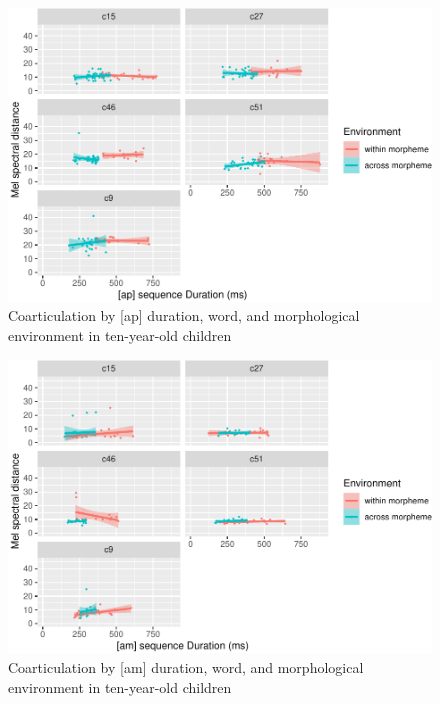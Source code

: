 \documentclass[a4paper,man,floatsintext,natbib,donotrepeattitle, apacite]{apa6}
\begin{document}
\begin{figure}
\centering
\includegraphics{3_ch3_results_files/figure-latex/ten-facet-ap-1.pdf}
\caption{\label{fig:ten-facet-ap}Coarticulation by {[}ap{]} duration, word, and morphological environment in ten-year-old children}
\end{figure}

\begin{figure}
\centering
\includegraphics{3_ch3_results_files/figure-latex/ten-facet-am-1.pdf}
\caption{\label{fig:ten-facet-am}Coarticulation by {[}am{]} duration, word, and morphological environment in ten-year-old children}
\end{figure}
\end{document}
